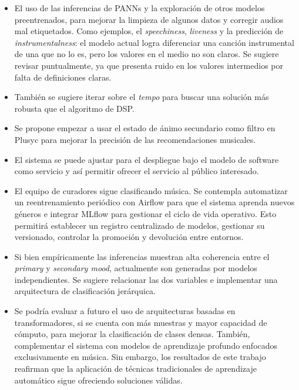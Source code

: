 \begin{itemize}
\item El uso de las inferencias de PANNs y la exploración de otros modelos preentrenados, para mejorar la limpieza de algunos datos y corregir audios mal etiquetados.
Como ejemplos, el \textit{speechiness}, \textit{liveness} y la predicción de \textit{instrumentalness}: el modelo actual logra diferenciar una canción instrumental de una que no lo es, pero los valores en el medio no son claros. 
Se sugiere revisar puntualmente, ya que presenta ruido en los valores intermedios por falta de definiciones claras.
\item También se sugiere iterar sobre el \textit{tempo} para buscar una solución más robusta que el algoritmo de DSP.
\item Se propone empezar a usar el estado de ánimo secundario como filtro en Plusyc para mejorar la precisión de las recomendaciones musicales.
\item El sistema se puede ajustar para el despliegue bajo el modelo de software como servicio y así permitir ofrecer el servicio al público interesado.
\item El equipo de curadores sigue clasificando música. Se contempla automatizar un reentrenamiento periódico con Airflow para que el sistema aprenda nuevos géneros e integrar MLflow para gestionar el ciclo de vida operativo. Esto permitirá establecer un registro centralizado de modelos, gestionar su versionado, controlar la promoción y devolución entre entornos.
\item Si bien empíricamente las inferencias muestran alta coherencia entre el \textit{primary} y \textit{secondary mood}, actualmente son generadas por modelos independientes. Se sugiere relacionar las dos variables e implementar una arquitectura de clasificación jerárquica.
\item Se podría evaluar a futuro el uso de arquitecturas basadas en transformadores, si se cuenta con más muestras y mayor capacidad de cómputo, para mejorar la clasificación de clases densas. 
También, complementar el sistema con modelos de aprendizaje profundo enfocados exclusivamente en música.
Sin embargo, los resultados de este trabajo reafirman que la aplicación de técnicas tradicionales de aprendizaje automático sigue ofreciendo soluciones válidas.
\end{itemize}

